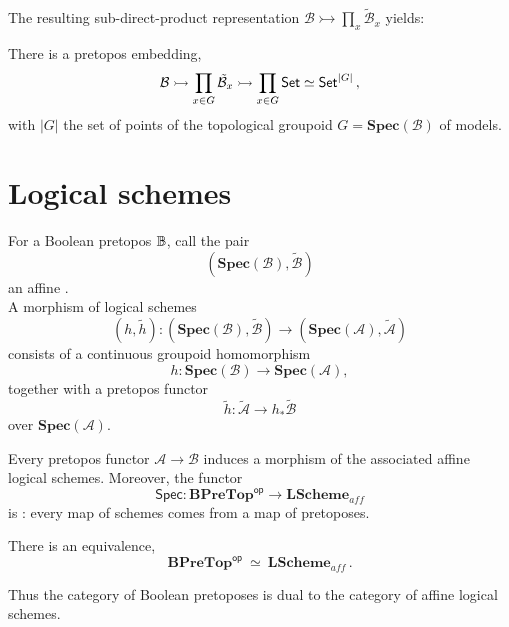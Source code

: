 \documentclass[lambek.tex]{subfiles}
\begin{document}
The resulting sub-direct-product representation $\mathcal{B}\rightarrowtail \prod_{x}\tilde{\mathcal{B}}_x$ yields:\\[1ex]

\begin{corollary} 
There is a pretopos embedding,
\[
\mathcal{B}\rightarrowtail \prod_{x\in G}\tilde{\mathcal{B}}_{x} \rightarrowtail \prod_{x\in G}\mathsf{Set} \simeq \mathsf{Set}^{|G|}\,,
\]
with $|G|$ the set of points of the topological groupoid $G = \mathbf{Spec}(\mathcal{B})$ of models.
\end{corollary}
\medskip

%
%

\section{Logical schemes}

For a Boolean pretopos $\mathbb{B}$, call the pair $$(\mathbf{Spec}(\mathcal{B}), \tilde{\mathcal{B}})$$ an affine .  \\

A morphism of logical schemes
\[
(h, \tilde{h}) : (\mathbf{Spec}(\mathcal{B}), \tilde{\mathcal{B}}) \to (\mathbf{Spec}(\mathcal{A}), \tilde{\mathcal{A}})
\]
consists of a continuous groupoid homomorphism 
\[
h : \mathbf{Spec}(\mathcal{B}) \to \mathbf{Spec}(\mathcal{A}),
\]
together with a pretopos functor 
\[
\tilde{h} : \tilde{\mathcal{A}} \to h_*\tilde{\mathcal{B}}
\]
over $\mathbf{Spec}(\mathcal{A})$.


\begin{theorem}[A.-Breiner 2012]
Every pretopos functor $\mathcal{A} \to \mathcal{B}$ induces a morphism of the associated affine logical schemes.  Moreover, the  functor
\[
\mathsf{Spec} : \mathbf{BPreTop}^{\mathsf{op}} \longrightarrow \mathbf{LScheme}_{aff}
\]
is : every map of schemes comes from a map of pretoposes.
\end{theorem}

\begin{corollary}
There is an equivalence,
\[
\mathbf{BPreTop}^{\mathsf{op}} \ \simeq\ \mathbf{LScheme}_{aff}\,.
\]
\end{corollary}

Thus the category of Boolean pretoposes is dual to the category of affine logical schemes.
\end{document}
